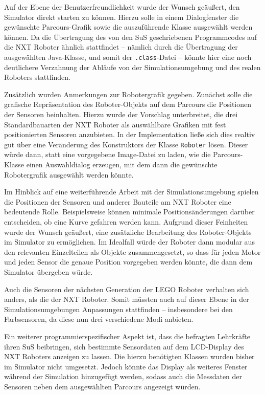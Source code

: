 \documentclass[paper=a4, DIV=calc, BCOR=12mm, twoside=on, onecolumn=on, open = right, titlepage =on, parskip =half-, headsepline = on, footsepline = off, chapterprefix = off, appendixprefix = on, fontsize = 12pt, numbers = noenddot, abstract = on]{scrbook}
\begin{document}
Auf der Ebene der Benutzerfreundlichkeit wurde der Wunsch geäußert, den Simulator direkt starten zu können. Hierzu solle in einem Dialogfenster die gewünschte Parcours-Grafik sowie die auszuführende Klasse ausgewählt werden können. Da die Übertragung des von den SuS geschriebenen Programmcodes auf die NXT Roboter ähnlich stattfindet -- nämlich durch die Übertragung der ausgewählten Java-Klasse, und somit der \texttt{.class}-Datei -- könnte hier eine noch deutlichere Verzahnung der Abläufe von der Simulationsumgebung und des realen Roboters stattfinden.

Zusätzlich wurden Anmerkungen zur Robotergrafik gegeben. Zunächst solle die grafische Repräsentation des Roboter-Objekts auf dem Parcours die Positionen der Sensoren beinhalten. Hierzu wurde der Vorschlag unterbreitet, die drei Standardbauarten der NXT Roboter als auswählbare Grafiken mit fest positionierten Sensoren anzubieten. In der Implementation ließe sich dies realtiv gut über eine Veränderung des Konstruktors der Klasse \texttt{Roboter} lösen. Dieser würde dann, statt eine vorgegebene Image-Datei zu laden, wie die Parcours-Klasse einen Auswahldialog erzeugen, mit dem dann die gewünschte Robotergrafik ausgewählt werden könnte.

Im Hinblick auf eine weiterführende Arbeit mit der Simulationsumgebung spielen die Positionen der Sensoren und anderer Bauteile am NXT Roboter eine bedeutende Rolle. Beispielsweise können minimale Positionsänderungen darüber entscheiden, ob eine Kurve gefahren werden kann. Aufgrund dieser Feinheiten wurde der Wunsch geäußert, eine zusätzliche Bearbeitung des Roboter-Objekts im Simulator zu ermöglichen. Im Idealfall würde der Roboter dann modular aus den relevanten Einzelteilen als Objekte zusammengesetzt, so dass für jeden Motor und jeden Sensor die genaue Position vorgegeben werden könnte, die dann dem Simulator übergeben würde.

Auch die Sensoren der nächsten Generation der \textsc{LEGO} Roboter verhalten sich anders, als die der NXT Roboter. Somit müssten auch auf dieser Ebene in der Simulationsumgebungen Anpassungen stattfinden -- insbesondere bei den Farbsensoren, da diese nun drei verschiedene Modi anbieten.

Ein weiterer programmierspezifischer Aspekt ist, dass die befragten Lehrkräfte ihren SuS beibringen, sich bestimmte Sensordaten auf dem LCD-Display des NXT Roboters anzeigen zu lassen. Die hierzu benötigten Klassen wurden bisher im Simulator nicht umgesetzt. Jedoch könnte das Display als weiteres Fenster während der Simulation hinzugefügt werden, sodass auch die Messdaten der Sensoren neben dem ausgewählten Parcours angezeigt würden. 
\end{document}
